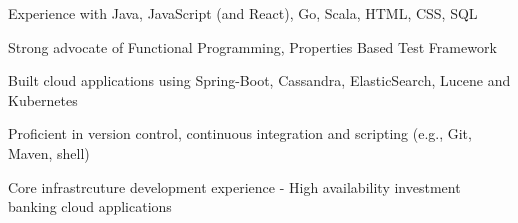 \begin{cvitems}
\sectionspace
\sectionspace
\vspace{1mm}
	\fontsize{11pt}{1.4em}\bodyfontlight\upshape\color{text}
        \item {Experience with Java, JavaScript (and React), Go, Scala, HTML, CSS, SQL}
        \item {Strong advocate of Functional Programming, Properties Based Test Framework}
        \item {Built cloud applications using Spring-Boot, Cassandra, ElasticSearch, Lucene and Kubernetes}
        \item {Proficient in version control, continuous integration and scripting (e.g., Git, Maven, shell)}
        \item {Core infrastrcuture development experience - High availability investment banking cloud applications}
        \end{cvitems}
\vspace{1mm}
\sectionspace
